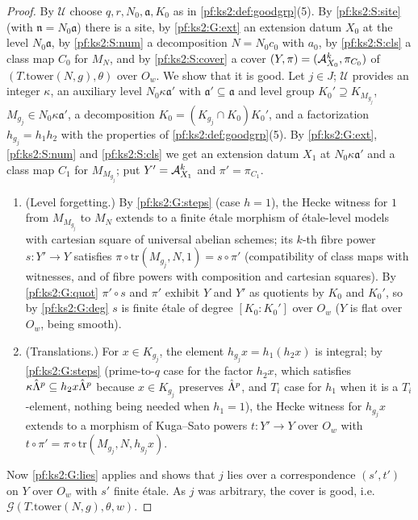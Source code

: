 \begin{proof}
By $\mathcal{U}$ choose $q,r,N_0,\mathfrak a,K_0$ as in \cref{pf:ks2:def:goodgrp}(5). By
\ref{pf:ks2:S:site} (with $\mathfrak n=N_0\mathfrak a$) there is a site, by \ref{pf:ks2:G:ext} an
extension datum $X_0$ at the level $N_0\mathfrak a$, by \ref{pf:ks2:S:num} a decomposition
$N=N_0c_0$ with $a_0$, by \ref{pf:ks2:S:cls} a class map $C_0$ for $M_N$, and by \ref{pf:ks2:S:cover}
a cover $(Y,\pi)=(\mathcal{A}_{X_0}^k,\pi_{C_0})$ of $(T.\mathrm{tower}(N,g),\theta)$ over $O_w$. We show that
it is good. Let $j\in J$; $\mathcal{U}$ provides an integer $\kappa$, an auxiliary level
$N_0\kappa\mathfrak a'$ with $\mathfrak a'\subseteq\mathfrak a$ and level group $K_0'\supseteq
K_{M_{g_j}}$, $M_{g_j}\in N_0\kappa\mathfrak a'$, a decomposition $K_0=(K_{g_j}\cap K_0)K_0'$, and a
factorization $h_{g_j}=h_1h_2$ with the properties of \cref{pf:ks2:def:goodgrp}(5). By
\ref{pf:ks2:G:ext}, \ref{pf:ks2:S:num} and \ref{pf:ks2:S:cls} we get an extension datum $X_1$ at
$N_0\kappa\mathfrak a'$ and a class map $C_1$ for $M_{M_{g_j}}$; put $Y'=\mathcal{A}_{X_1}^k$ and
$\pi'=\pi_{C_1}$.
\begin{enumerate}[label=(\alph*)]
\item (Level forgetting.) By \ref{pf:ks2:G:steps} (case $h=1$), the Hecke witness for $1$ from
  $M_{M_{g_j}}$ to $M_N$ extends to a finite \'etale morphism of \'etale-level models with cartesian
  square of universal abelian schemes; its $k$-th fibre power $s\colon Y'\to Y$ satisfies
  $\pi\circ\mathrm{tr}(M_{g_j},N,1)=s\circ\pi'$ (compatibility of class maps with witnesses,
  and of fibre powers with composition and cartesian squares). By \ref{pf:ks2:G:quot} $\pi'\circ s$ and $\pi'$ exhibit $Y$
  and $Y'$ as quotients by $K_0$ and $K_0'$, so by \ref{pf:ks2:G:deg} $s$ is finite \'etale of degree
  $[K_0:K_0']$ over $O_w$ ($Y$ is flat over $O_w$, being smooth).
\item (Translations.) For $x\in K_{g_j}$, the element $h_{g_j}x=h_1(h_2x)$ is integral; by
  \ref{pf:ks2:G:steps} (prime-to-$q$ case for the factor $h_2x$, which satisfies
  $\kappa\hat\Lambda^{p}\subseteq h_2x\hat\Lambda^{p}$ because $x\in K_{g_j}$ preserves $\hat\Lambda^{p}$, and $T_i$
  case for $h_1$ when it is a $T_i$-element,
  nothing being needed when $h_1=1$), the Hecke witness for $h_{g_j}x$ extends to a morphism of
  Kuga--Sato powers $t\colon Y'\to Y$ over $O_w$ with $t\circ\pi'=\pi\circ\mathrm{tr}(M_{g_j},N,h_{g_j}x)$.
\end{enumerate}
Now \ref{pf:ks2:G:lies} applies and shows that $j$ lies over a correspondence $(s',t')$ on $Y$ over
$O_w$ with $s'$ finite \'etale. As $j$ was arbitrary, the cover is good, i.e.\
$\mathcal{G}(T.\mathrm{tower}(N,g),\theta,w)$.
\end{proof}

